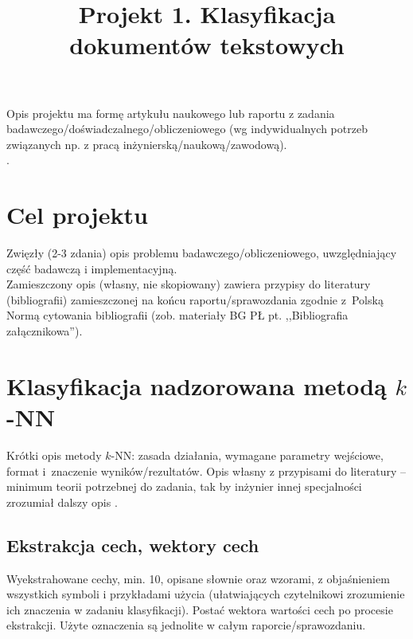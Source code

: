 \documentclass{classrep}
\author{
  \studentinfo{Autor Pierwszy}{nr albumu 1} \and
  \studentinfo{Autor Drugi}{nr albumu 2} }
\title{Projekt 1. Klasyfikacja dokumentów tekstowych}
\begin{document}
\maketitle

Opis projektu ma formę artykułu naukowego lub raportu z zadania
badawczego/doświadczalnego/obliczeniowego (wg indywidualnych potrzeb związanych np. z
pracą inżynierską/naukową/zawodową). \\
. 

\section{Cel projektu}
Zwięzły (2-3 zdania) opis
problemu badawczego/obliczeniowego,  uwzględniający część badawczą i implementacyjną. \\
\indent Zamieszczony opis (własny, nie skopiowany) zawiera
przypisy do literatury (bibliografii) zamieszczonej na końcu raportu/sprawozdania
zgodnie z~Polską Normą cytowania bibliografii (zob. materiały BG PŁ pt. ,,Bibliografia
załącznikowa'').\\


\section{Klasyfikacja nadzorowana metodą $k$-NN}
Krótki opis metody $k$-NN: zasada działania, wymagane parametry wejściowe, format
i~znaczenie wyników/rezultatów. Opis własny z przypisami do literatury -- minimum
teorii potrzebnej do zadania, tak by inżynier innej specjalności zrozumiał dalszy
opis \cite{tadeusiewicz90}.\\

\subsection{Ekstrakcja cech, wektory cech}
Wyekstrahowane cechy, min. 10, opisane słownie oraz wzorami, z objaśnieniem
wszystkich symboli i przykładami użycia (ułatwiających czytelnikowi zrozumienie ich
znaczenia w zadaniu klasyfikacji). Postać wektora wartości cech po procesie
ekstrakcji. Użyte oznaczenia są jednolite w całym
raporcie/sprawozdaniu. \\ 
\end{document}
